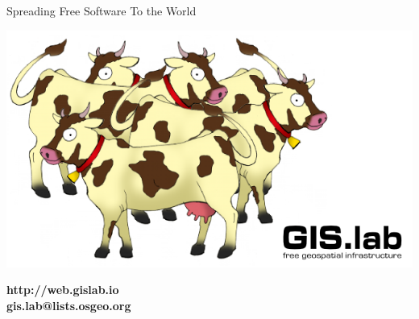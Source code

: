 \documentclass[12pt]{beamer}
\begin{document}
\begin{frame}[plain]{Spreading Free Software To the World}
	\begin{center}
		\includegraphics[keepaspectratio=true,width=\textwidth]{images/cows.png}
	\end{center}
\end{frame}

\begin{frame}[plain]
	\begin{center}
		\textbf{http://web.gislab.io}\\
		\textbf{gis.lab@lists.osgeo.org}
	\end{center}
\end{frame}


\end{document}
